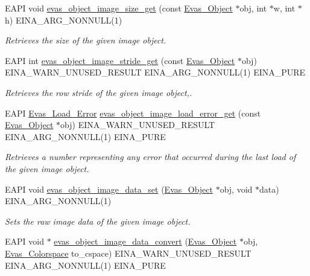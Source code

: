 \begin{DoxyCompactItemize}
EAPI void \hyperlink{group__Evas__Object__Image_ga43e6f1b16ebe859826e6901cb36995ad}{evas\_\-object\_\-image\_\-size\_\-get} (const \hyperlink{group__Evas__Object__Group_ga9e19e6dd1f517a0ba437c0114d3e7c97}{Evas\_\-Object} $\ast$obj, int $\ast$w, int $\ast$h) EINA\_\-ARG\_\-NONNULL(1)
\begin{DoxyCompactList}\small\item\em Retrieves the size of the given image object. \item\end{DoxyCompactList}\item 
EAPI int \hyperlink{group__Evas__Object__Image_gab72175381532640c620dd032e56c590b}{evas\_\-object\_\-image\_\-stride\_\-get} (const \hyperlink{group__Evas__Object__Group_ga9e19e6dd1f517a0ba437c0114d3e7c97}{Evas\_\-Object} $\ast$obj) EINA\_\-WARN\_\-UNUSED\_\-RESULT EINA\_\-ARG\_\-NONNULL(1) EINA\_\-PURE
\begin{DoxyCompactList}\small\item\em Retrieves the row stride of the given image object,. \item\end{DoxyCompactList}\item 
EAPI \hyperlink{Evas_8h_aff351ae694a58aecd7834ef12bdf3d64}{Evas\_\-Load\_\-Error} \hyperlink{group__Evas__Object__Image_ga46e4a0b2b916d28694ad054549f88e24}{evas\_\-object\_\-image\_\-load\_\-error\_\-get} (const \hyperlink{group__Evas__Object__Group_ga9e19e6dd1f517a0ba437c0114d3e7c97}{Evas\_\-Object} $\ast$obj) EINA\_\-WARN\_\-UNUSED\_\-RESULT EINA\_\-ARG\_\-NONNULL(1) EINA\_\-PURE
\begin{DoxyCompactList}\small\item\em Retrieves a number representing any error that occurred during the last load of the given image object. \item\end{DoxyCompactList}\item 
EAPI void \hyperlink{group__Evas__Object__Image_gabdd65e4c69f422ddcf0d3c8720859a92}{evas\_\-object\_\-image\_\-data\_\-set} (\hyperlink{group__Evas__Object__Group_ga9e19e6dd1f517a0ba437c0114d3e7c97}{Evas\_\-Object} $\ast$obj, void $\ast$data) EINA\_\-ARG\_\-NONNULL(1)
\begin{DoxyCompactList}\small\item\em Sets the raw image data of the given image object. \item\end{DoxyCompactList}\item 
EAPI void $\ast$ \hyperlink{group__Evas__Object__Image_ga3072cf7c31cf33057abd8ae8876218cd}{evas\_\-object\_\-image\_\-data\_\-convert} (\hyperlink{group__Evas__Object__Group_ga9e19e6dd1f517a0ba437c0114d3e7c97}{Evas\_\-Object} $\ast$obj, \hyperlink{group__Evas__Object__Image_ga8c6e60db9c8b83b155ccea52957ff656}{Evas\_\-Colorspace} to\_\-cspace) EINA\_\-WARN\_\-UNUSED\_\-RESULT EINA\_\-ARG\_\-NONNULL(1) EINA\_\-PURE

\end{DoxyCompactItemize}
